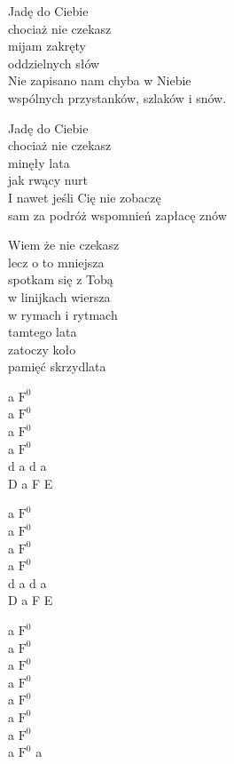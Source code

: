 \begin{text}
    Jadę do Ciebie\\
    chociaż nie czekasz\\
    mijam zakręty\\
    oddzielnych słów\\
    Nie zapisano nam chyba w Niebie\\
    wspólnych przystanków, szlaków i snów.

    Jadę do Ciebie\\
    chociaż nie czekasz\\
    minęły lata\\
    jak rwący nurt\\
    I nawet jeśli Cię nie zobaczę\\
    sam za podróż wspomnień zapłacę znów

    Wiem że nie czekasz\\
    lecz o to mniejsza\\
    spotkam się z Tobą\\
    w linijkach wiersza\\
    w rymach i rytmach\\
    tamtego lata\\
    zatoczy koło\\
    pamięć skrzydlata
\end{text}
\begin{chord}
    a $\mathrm{F^{0}}$\\
    a $\mathrm{F^{0}}$\\
    a $\mathrm{F^{0}}$\\
    a $\mathrm{F^{0}}$\\
    d a d a\\
    D a F E

    a $\mathrm{F^{0}}$\\
    a $\mathrm{F^{0}}$\\
    a $\mathrm{F^{0}}$\\
    a $\mathrm{F^{0}}$\\
    d a d a\\
    D a F E

    a $\mathrm{F^{0}}$\\
    a $\mathrm{F^{0}}$\\
    a $\mathrm{F^{0}}$\\
    a $\mathrm{F^{0}}$\\
    a $\mathrm{F^{0}}$\\
    a $\mathrm{F^{0}}$\\
    a $\mathrm{F^{0}}$\\
    a $\mathrm{F^{0}}$ a
\end{chord}
